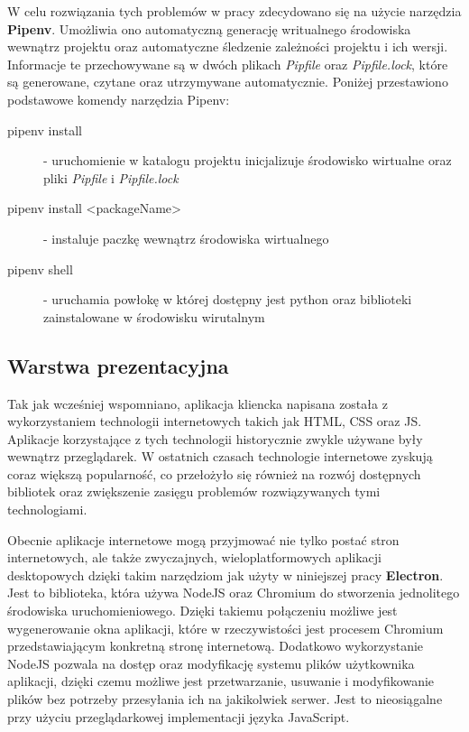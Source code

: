 \documentclass[10pt,polish,a4paper,oneside]{ppfcmthesis}
\begin{document}
W celu rozwiązania tych problemów w pracy zdecydowano się na użycie narzędzia \textbf{Pipenv}.
Umożliwia ono automatyczną generację writualnego środowiska wewnątrz projektu oraz automatyczne
śledzenie zależności projektu i ich wersji. Informacje te przechowywane są w dwóch plikach
\textit{Pipfile} oraz \textit{Pipfile.lock}, które są generowane, czytane oraz utrzymywane automatycznie.
Poniżej przestawiono podstawowe komendy narzędzia Pipenv:

\begin{description}
  \item[pipenv install] - uruchomienie w katalogu projektu inicjalizuje środowisko wirtualne oraz pliki
  \textit{Pipfile} i \textit{Pipfile.lock}

  \item[pipenv install <packageName>] - instaluje paczkę wewnątrz środowiska wirtualnego

  \item[pipenv shell] - uruchamia powłokę w której dostępny jest python oraz biblioteki zainstalowane
  w środowisku wirutalnym
\end{description}

\subsection{Warstwa prezentacyjna}

Tak jak wcześniej wspomniano, aplikacja kliencka napisana została z wykorzystaniem technologii
internetowych takich jak HTML, CSS oraz JS. Aplikacje korzystające z tych technologii historycznie
zwykle używane były wewnątrz przeglądarek. W ostatnich czasach technologie internetowe zyskują
coraz większą popularnoś\'c, co przełożyło się również na rozwój dostępnych bibliotek oraz zwiększenie
zasięgu problemów rozwiązywanych tymi technologiami.

Obecnie aplikacje internetowe mogą przyjmowa\'c nie tylko posta\'c stron internetowych, ale także
zwyczajnych, wieloplatformowych aplikacji desktopowych dzięki takim narzędziom jak użyty w niniejszej
pracy \textbf{Electron}. Jest to biblioteka, która używa NodeJS oraz Chromium do stworzenia jednolitego
środowiska uruchomieniowego. Dzięki takiemu połączeniu możliwe jest wygenerowanie okna aplikacji, które
w rzeczywistości jest procesem Chromium przedstawiającym konkretną stronę internetową. Dodatkowo wykorzystanie
NodeJS pozwala na dostęp oraz modyfikację systemu plików użytkownika aplikacji, dzięki czemu możliwe jest przetwarzanie,
usuwanie i modyfikowanie plików bez potrzeby przesyłania ich na jakikolwiek serwer. Jest to nieosiągalne
przy użyciu przeglądarkowej implementacji języka JavaScript.\newline
\end{document}
